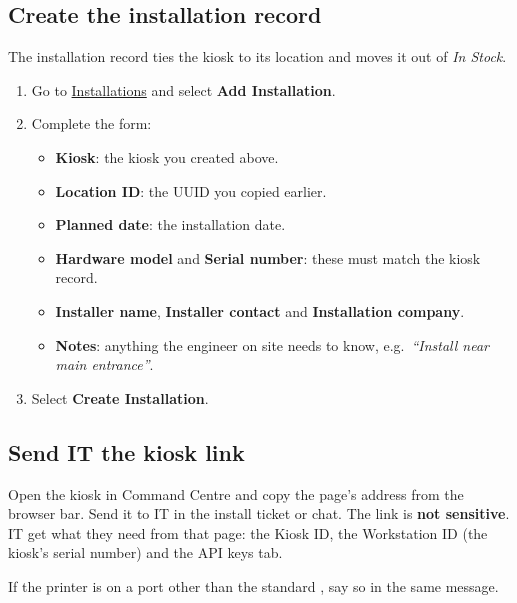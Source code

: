 \documentclass[a4paper,10pt]{article}
\begin{document}
\subsection{Create the installation record}

The installation record ties the kiosk to its location and moves it out of
\emph{In Stock}.

\begin{enumerate}
  \item Go to
        \href{https://command.weknow.technology/installations}{Installations}
        and select \textbf{Add Installation}.

  \item Complete the form:
    \begin{itemize}
      \item \textbf{Kiosk}: the kiosk you created above.
      \item \textbf{Location ID}: the UUID you copied earlier.
      \item \textbf{Planned date}: the installation date.
      \item \textbf{Hardware model} and \textbf{Serial number}: these must
            match the kiosk record.
      \item \textbf{Installer name}, \textbf{Installer contact} and
            \textbf{Installation company}.
      \item \textbf{Notes}: anything the engineer on site needs to
            know, e.g.\ \emph{``Install near main entrance''}.
    \end{itemize}

  \item Select \textbf{Create Installation}.
\end{enumerate}


\subsection{Send IT the kiosk link}\label{sec:handover}

Open the kiosk in Command Centre and copy the page's address from the
browser bar. Send it to IT in the install ticket or chat. The link is
\textbf{not sensitive}. IT get what they need from that page: the Kiosk
ID, the Workstation ID (the kiosk's serial number) and the API keys tab.

If the printer is on a port other than the standard , say so
in the same message.
\end{document}
